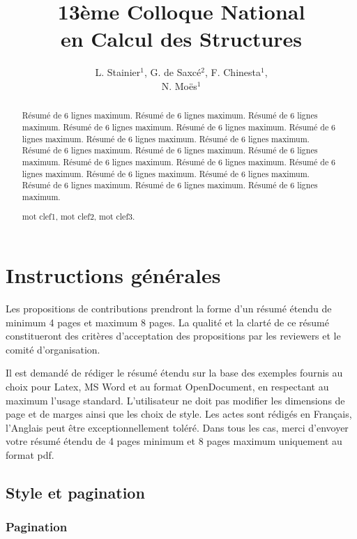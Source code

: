 \documentclass{CSMA2017}
\title{13ème Colloque National \\ en Calcul des Structures}
\author{L. Stainier$^1$, G. de Saxcé$^2$, F. Chinesta$^1$, \\N. Moës$^1$}
\begin{document}
\maketitle

\begin{abstract}
Résumé de 6 lignes maximum. Résumé de 6 lignes maximum. Résumé de 6 lignes maximum. Résumé de 6 lignes maximum. Résumé de 6 lignes maximum. Résumé de 6 lignes maximum. Résumé de 6 lignes maximum. Résumé de 6 lignes maximum. Résumé de 6 lignes maximum. Résumé de 6 lignes maximum. Résumé de 6 lignes maximum. Résumé de 6 lignes maximum. Résumé de 6 lignes maximum. Résumé de 6 lignes maximum. Résumé de 6 lignes maximum. Résumé de 6 lignes maximum. Résumé de 6 lignes maximum. Résumé de 6 lignes maximum. Résumé de 6 lignes maximum.

\keywords mot clef1, mot clef2, mot clef3.
\end{abstract}

\section{Instructions générales}

Les propositions de contributions prendront la forme d'un résumé étendu de minimum 4 pages et maximum 8 pages. La qualité et la clarté de ce résumé constitueront des critères d'acceptation des propositions par les reviewers et le comité d'organisation.

Il est demandé de rédiger le résumé étendu sur la base des exemples fournis au choix pour Latex, MS Word et au format OpenDocument, en respectant au maximum l'usage standard. L'utilisateur ne doit pas modifier les dimensions de page et de marges ainsi que les choix de style. Les actes sont rédigés en Français, l'Anglais peut être exceptionnellement toléré. Dans tous les cas, merci d'envoyer votre résumé étendu de 4 pages minimum et 8 pages maximum uniquement au format pdf.

\subsection{Style et pagination}

\subsubsection{Pagination}
\end{document}
